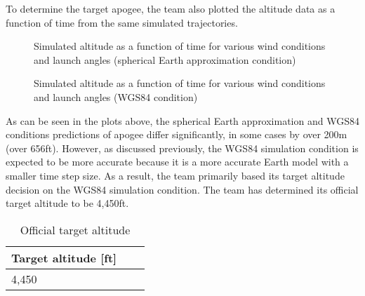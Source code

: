 To determine the target apogee, the team also plotted the altitude data as a function of time from the same simulated trajectories.
\begin{figure}[h]
    \centering
    \caption{Simulated altitude as a function of time for various wind conditions and launch angles (spherical Earth approximation condition)}
    \label{fig:my_label}
\end{figure}
\begin{figure}[h]
    \centering
    \caption{Simulated altitude as a function of time for various wind conditions and launch angles (WGS84 condition)}
    \label{fig:my_label}
\end{figure}
As can be seen in the plots above, the spherical Earth approximation and WGS84 conditions predictions of apogee differ significantly, in some cases by over 200m (over 656ft). However, as discussed previously, the WGS84 simulation condition is expected to be more accurate because it is a more accurate Earth model with a smaller time step size. As a result, the team primarily based its target altitude decision on the WGS84 simulation condition. The team has determined its official target altitude to be 4,450ft.
\begin{table}[H]
\centering
\caption{Official target altitude}
\label{tab:FlightDynamics:TargetAltitude}
\begin{tabularx}{.5\linewidth}{XlX}
\toprule
  \textbf{Target altitude [ft]}\\
\midrule
4,450 \\
\bottomrule
\end{tabularx}
\end{table}


